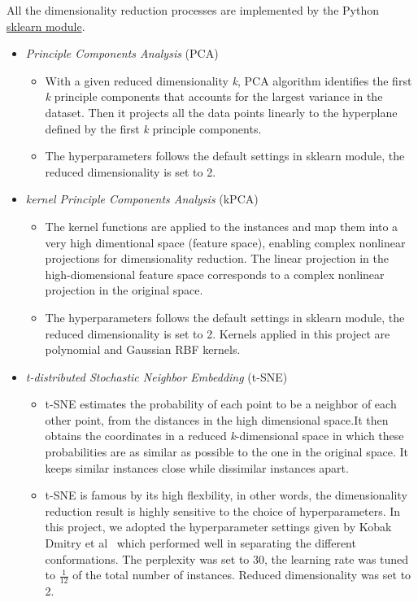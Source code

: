 \documentclass[a4paper]{article}
\begin{document}
\noindent All the dimensionality reduction processes are implemented by the Python \href{https://scikit-learn.org/stable/user_guide.html}{sklearn module}.
\begin{itemize}
    \item \textit{Principle Components Analysis} (PCA) 
    \begin{itemize}
        \item With a given reduced dimensionality \textit{k}, PCA algorithm identifies the first \textit{k} principle components that accounts for the largest variance in the dataset. Then it projects all the data points linearly to the hyperplane defined by the first \textit{k} principle components.
        \item The hyperparameters follows the default settings in sklearn module, the reduced dimensionality is set to 2.
    \end{itemize}
    
    \item \textit{kernel Principle Components Analysis} (kPCA)
    \begin{itemize}
        \item The kernel functions are applied to the instances and map them into a very high dimentional space (feature space), enabling complex nonlinear projections for dimensionality reduction. The linear projection in the high-diomensional feature space corresponds to a complex nonlinear projection in the original space.
        \item The hyperparameters follows the default settings in sklearn module, the reduced dimensionality is set to 2. Kernels applied in this project are polynomial and Gaussian RBF kernels. 
    \end{itemize}
    
    \item \textit{t-distributed Stochastic Neighbor Embedding} (t-SNE)
    \begin{itemize}
        \item t-SNE estimates the probability of each point to be a neighbor of each other point, from the distances in the high dimensional space.It then obtains the coordinates in a reduced \textit{k}-dimensional space in which these probabilities are as similar as possible to the one in the original space. It keeps similar instances close while dissimilar instances apart.
        \item t-SNE is famous by its high flexbility, in other words, the dimensionality reduction result is highly sensitive to the choice of hyperparameters. In this project, we adopted the hyperparameter settings given by Kobak Dmitry et al~\cite{KobakDmitry} which performed well in separating the different conformations. The perplexity was set to 30, the learning rate was tuned to \(  \frac{1}{12} \) of the total number of instances. Reduced dimensionality was set to 2.
    \end{itemize}
    
\end{itemize}
\pagebreak
\end{document}
